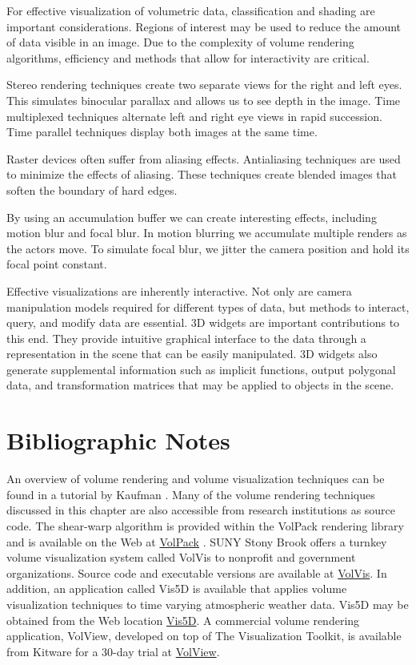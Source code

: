 For effective visualization of volumetric data, classification and shading are important considerations. Regions of interest may be used to reduce the amount of data visible in an image. Due to the complexity of volume rendering algorithms, efficiency and methods that allow for interactivity are critical.

Stereo rendering techniques create two separate views for the right and left eyes. This simulates binocular parallax and allows us to see depth in the image. Time multiplexed techniques alternate left and right eye views in rapid succession. Time parallel techniques display both images at the same time.

Raster devices often suffer from aliasing effects. Antialiasing techniques are used to minimize the effects of aliasing. These techniques create blended images that soften the boundary of hard edges.

By using an accumulation buffer we can create interesting effects, including motion blur and focal blur. In motion blurring we accumulate multiple renders as the actors move. To simulate focal blur, we jitter the camera position and hold its focal point constant.

Effective visualizations are inherently interactive. Not only are camera manipulation models required for different types of data, but methods to interact, query, and modify data are essential. 3D widgets are important contributions to this end. They provide intuitive graphical interface to the data through a representation in the scene that can be easily manipulated. 3D widgets also generate supplemental information such as implicit functions, output polygonal data, and transformation matrices that may be applied to objects in the scene.

\section{Bibliographic Notes}

An overview of volume rendering and volume visualization techniques can be found in a tutorial by Kaufman \cite{Kaufman91}. Many of the volume rendering techniques discussed in this chapter are also accessible from research institutions as source code. The shear-warp algorithm is provided within the VolPack rendering library and is available on the Web at \href{http:www-graphics.stanford.edu/software/volpack/}{VolPack} . SUNY Stony Brook offers a turnkey volume visualization system called VolVis to nonprofit and government organizations. Source code and executable versions are available at \href{http://www.cs.sunysb.edu/\~volvis}{VolVis}. In addition, an application called Vis5D is available that applies volume visualization techniques to time varying atmospheric weather data. Vis5D may be obtained from the Web location \href{http://vis5d.sourceforge.net}{Vis5D}. A commercial volume rendering application, VolView, developed on top of The Visualization Toolkit, is available from Kitware for a 30-day trial at \href{http://www.kitware.com/products/volview.html}{VolView}.

